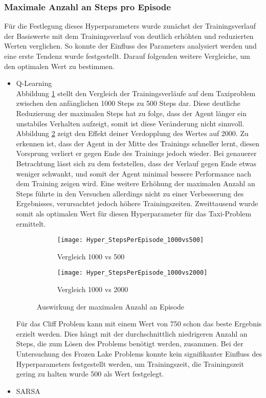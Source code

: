 \subsubsection{Maximale Anzahl an Steps pro Episode}
Für die Festlegung dieses Hyperparameters wurde zunächst der Trainingsverlauf der Basiswerte mit dem Trainingsverlauf von deutlich erhöhten und reduzierten Werten verglichen.
So konnte der Einfluss des Parameters analysiert werden und eine erste Tendenz wurde festgestellt. Darauf folgenden weitere Vergleiche, um den optimalen Wert zu bestimmen.
\begin{itemize}
    \item Q-Learning\\
    Abbildung \ref{fig:MaxStepCount_1000vs500} stellt den Vergleich der Trainingsverläufe auf dem Taxiproblem zwischen den anfänglichen 1000 Steps zu 500 Steps dar.
    Diese deutliche Reduzierung der maximalen Steps hat zu folge, dass der Agent länger ein unstabiles Verhalten aufzeigt, somit ist diese Veränderung nicht sinnvoll.
    Abbildung \ref{fig:MaxStepCount_1000vs2000} zeigt den Effekt deiner Verdopplung des Wertes auf 2000. Zu erkennen ist, dass der Agent in der Mitte des Trainings schneller lernt, diesen Vorsprung verliert er gegen Ende des Trainings jedoch wieder.
    Bei genauerer Betrachtung lässt sich zu dem feststellen, dass der Verlauf gegen Ende etwas weniger schwankt, und somit der Agent minimal bessere Performance nach dem Training zeigen wird. 
    Eine weitere Erhöhung der maximalen Anzahl an Steps führte in den Versuchen allerdings nicht zu einer Verbesserung des Ergebnisses, verursachtet jedoch höhere Trainingszeiten.
    Zweittausend wurde somit als optimalen Wert für diesen Hyperparameter für das Taxi-Problem ermittelt. 

    \begin{figure}[H]
        \centering
        \begin{subfigure}{.5\textwidth}
          \centering
          \texttt{[image: Hyper\_StepsPerEpisode\_1000vs500]}
          \caption{Vergleich 1000 vs 500}
          \label{fig:MaxStepCount_1000vs500}
        \end{subfigure}%
        \begin{subfigure}{.5\textwidth}
          \centering
          \texttt{[image: Hyper\_StepsPerEpisode\_1000vs2000]}
          \caption{Vergleich 1000 vs 2000}
          \label{fig:MaxStepCount_1000vs2000}
        \end{subfigure}
        \caption{Auswirkung der maximalen Anzahl an Episode}
        \label{fig:MaxStepCount}
    \end{figure}

    Für das Cliff Problem kann mit einem Wert von 750 schon das beste Ergebnis erzielt werden. 
    Dies hängt mit der durchschnittlich niedrigeren Anzahl an Steps, die zum Lösen des Problems benötigt werden, zusammen. 
    Bei der Untersuchung des Frozen Lake Problems konnte kein signifikanter Einfluss des Hyperparameters festgestellt werden, um Trainingszeit, die Trainingszeit gering zu halten wurde 500 als Wert festgelegt.
    \item SARSA\\

\end{itemize}
